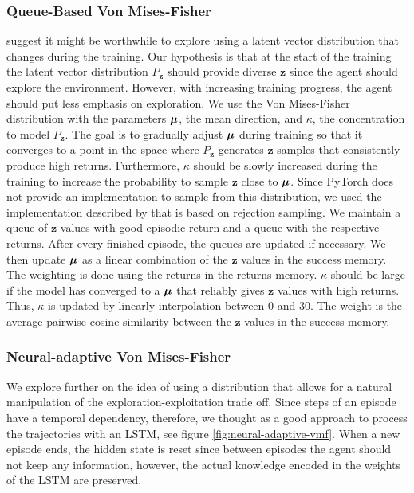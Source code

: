 \documentclass[10pt]{article} %
\begin{document}
\subsubsection{Queue-Based Von Mises-Fisher}
\cite{rle-paper} suggest it might be worthwhile to explore using a latent vector distribution that changes during the training. Our hypothesis is that at the start of the training the latent vector distribution $P_{\textbf{z}}$ should provide diverse $\textbf{z}$ since the agent should explore the environment. However, with increasing training progress, the agent should put less emphasis on exploration. We use the Von Mises-Fisher distribution with the parameters ${\bm{\mu}}$, the mean direction, and $\kappa$, the concentration to model $P_{\textbf{z}}$. The goal is to gradually adjust ${\bm{\mu}}$ during training so that it converges to a point in the space where $P_{\textbf{z}}$ generates $\mathbf{z}$ samples that consistently produce high returns. Furthermore, $\kappa$ should be slowly increased during the training to increase the probability to sample $\mathbf{z}$ close to ${\bm{\mu}}$. Since PyTorch does not provide an implementation to sample from this distribution, we used the implementation described by \cite{von-mises-fisher-paper} that is based on rejection sampling. We maintain a queue of $\textbf{z}$ values with good episodic return and a queue with the respective returns. After every finished episode, the queues are updated if necessary. We then update ${\bm{\mu}}$ as a linear combination of the $\textbf{z}$ values in the success memory. The weighting is done using the returns in the returns memory. $\kappa$ should be large if the model has converged to a ${\bm{\mu}}$ that reliably gives $\textbf{z}$ values with high returns. Thus, $\kappa$ is updated by linearly interpolation between $0$ and $30$. The weight is the average pairwise cosine similarity between the $\textbf{z}$ values in the success memory.

\vspace{-1pt}
\subsubsection{Neural-adaptive Von Mises-Fisher}

We explore further on the idea of using a distribution that allows for a natural manipulation of the exploration-exploitation trade off. Since steps of an episode have a temporal dependency, therefore, we thought as a good approach to process the trajectories with an LSTM, see figure \ref{fig:neural-adaptive-vmf}. When a new episode ends, the hidden state is reset since between episodes the agent should not keep any information, however, the actual knowledge encoded in the weights of the LSTM are preserved. 
\end{document}
